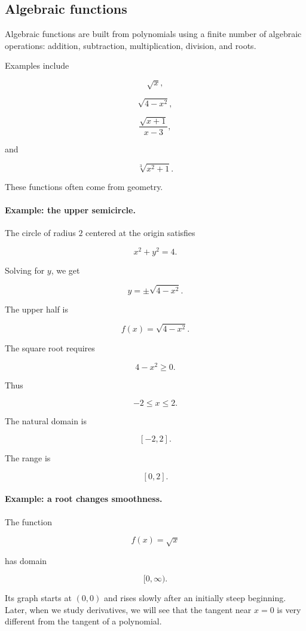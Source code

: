 \subsection{Algebraic functions}
\label{subsec:algebraic-functions}

Algebraic functions are built from polynomials using a finite number of algebraic operations: addition, subtraction, multiplication, division, and roots.

Examples include

\[
\sqrt{x},
\]

\[
\sqrt{4-x^2},
\]

\[
\frac{\sqrt{x+1}}{x-3},
\]

and

\[
\sqrt[3]{x^2+1}.
\]

These functions often come from geometry.

\paragraph{Example: the upper semicircle.}
The circle of radius \(2\) centered at the origin satisfies

\[
x^2+y^2=4.
\]

Solving for \(y\), we get

\[
y=\pm\sqrt{4-x^2}.
\]

The upper half is

\[
f(x)=\sqrt{4-x^2}.
\]

The square root requires

\[
4-x^2\ge 0.
\]

Thus

\[
-2\le x\le 2.
\]

The natural domain is

\[
[-2,2].
\]

The range is

\[
[0,2].
\]

\paragraph{Example: a root changes smoothness.}
The function

\[
f(x)=\sqrt{x}
\]

has domain

\[
[0,\infty).
\]

Its graph starts at \((0,0)\) and rises slowly after an initially steep beginning. Later, when we study derivatives, we will see that the tangent near \(x=0\) is very different from the tangent of a polynomial.

